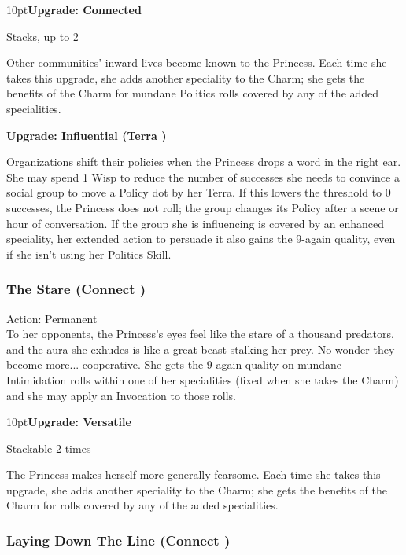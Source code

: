 \begin{myindentpar}{10pt}\textbf{Upgrade: Connected}

Stacks, up to 2

Other communities' inward lives become known to the Princess. Each time she takes this upgrade, she adds another speciality to the Charm; she gets the benefits of the Charm for mundane Politics rolls covered by any of the added specialities.

\textbf{Upgrade: Influential (Terra \textbullet\textbullet)}

Organizations shift their policies when the Princess drops a word in the right ear. She may spend 1 Wisp to reduce the number of successes she needs to convince a social group to move a Policy dot by her Terra. If this lowers the threshold to 0 successes, the Princess does not roll; the group changes its Policy after a scene or hour of conversation. If the group she is influencing is covered by an enhanced speciality, her extended action to persuade it also gains the 9-again quality, even if she isn't using her Politics Skill.\end{myindentpar}

\subsubsection*{The Stare (Connect \textbullet)}

\noindent Action: Permanent\\

\noindent To her opponents, the Princess’s eyes feel like the stare of a thousand predators, and the aura she exhudes is like a great beast stalking her prey. No wonder they become more... cooperative. She gets the 9-again quality on mundane Intimidation rolls within one of her specialities (fixed when she takes the Charm) and she may apply an Invocation to those rolls. 

\begin{myindentpar}{10pt}\textbf{Upgrade: Versatile}

Stackable 2 times

The Princess makes herself more generally fearsome. Each time she takes this upgrade, she adds another speciality to the Charm; she gets the benefits of the Charm for rolls covered by any of the added specialities.\end{myindentpar}

\subsubsection*{Laying Down The Line (Connect \textbullet)}

